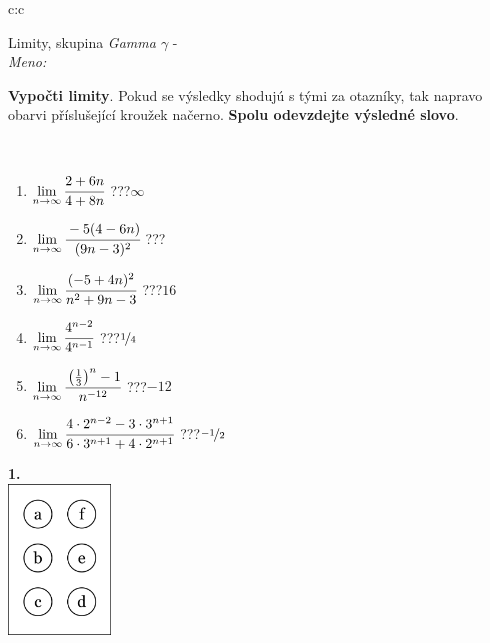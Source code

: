 \documentclass[10pt]{report}
\begin{document}
\begin{tabular}{c:c}
\begin{minipage}[c][104.5mm][t]{0.5\linewidth}
\begin{center}
\vspace{7mm}
{\huge Limity, skupina \textit{Gamma $\gamma$} -}\\[5mm]
\textit{Meno:}\phantom{xxxxxxxxxxxxxxxxxxxxxxxxxxxxxxxxxxxxxxxxxxxxxxxxxxxxxxxxxxxxxxxxx}\\[5mm]
\begin{minipage}{0.95\linewidth}
\begin{center}
\textbf{Vypočti limity}. Pokud se výsledky shodujú s tými za otazníky, tak napravo\\obarvi příslušející kroužek načerno. \textbf{Spolu odevzdejte výsledné slovo}.
\end{center}
\end{minipage}
\\[1mm]
\begin{minipage}{0.79\linewidth}
\begin{center}
\begin{varwidth}{\linewidth}
\begin{enumerate}
\normalsize
\item $\lim\limits_{n\to\infty}\cfrac{2+6n}{4+8n}$\quad \dotfill\; ???\;\dotfill \quad $\infty$
\item $\lim\limits_{n\to\infty}\cfrac{-5(4-6n)}{(9n-3)^2}$\quad \dotfill\; ???\;\dotfill {}
\item $\lim\limits_{n\to\infty}\cfrac{(-5+4n)^2}{n^2+9n-3}$\quad \dotfill\; ???\;\dotfill \quad $16$
\item $\lim\limits_{n\to\infty}\cfrac{4^{n-2}}{4^{n-1}}$\quad \dotfill\; ???\;\dotfill \quad $\nicefrac{1}{4}$
\item $\lim\limits_{n\to\infty}\cfrac{\left(\frac{1}{3}\right)^n -1}{n^{-12}}$\quad \dotfill\; ???\;\dotfill \quad $-12$
\item $\lim\limits_{n\to\infty}\cfrac{4\cdot 2^{n-2}-3\cdot 3^{n+1}}{6\cdot 3^{n+1}+4\cdot 2^{n+1}}$\quad \dotfill\; ???\;\dotfill \quad $\nicefrac{-1}{2}$
\end{enumerate}
\end{varwidth}
\end{center}
\end{minipage}
\begin{minipage}{0.20\linewidth}
\begin{center}
{\Huge\bfseries 1.} \\[2mm]
\includegraphics[height=40mm]{../images/braille.png}

\end{center}
\end{minipage}
\end{center}
\end{minipage}
\end{tabular}
\end{document}
